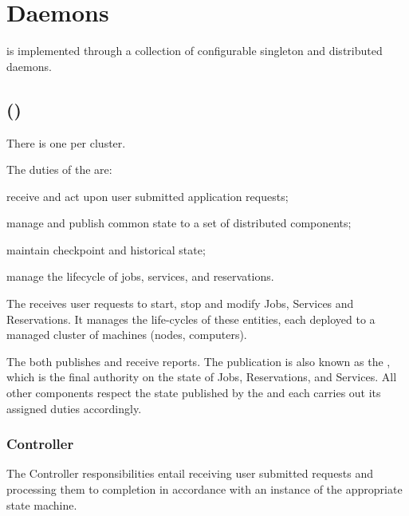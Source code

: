     \section{Daemons}
    
    \varDUCC is implemented through a collection of configurable singleton 
    and distributed daemons.
    
    \subsection{\varOrchestrator (\varOR)} 
    
    There is one \varOrchestrator per \varDUCC cluster.
    
    The duties of the \varOrchestrator are:
    
    \begin{description}
      \item receive and act upon user submitted application requests;
      \item manage and publish common state to a set of distributed components;
      \item maintain checkpoint and historical state;
      \item manage the lifecycle of jobs, services, and reservations.
    \end{description}
    
    The \varOrchestrator receives user requests to start, stop and modify 
    Jobs, Services and Reservations. It manages the life-cycles of these
    entities, each deployed to a managed cluster of machines 
    (nodes, computers).
    
    The \varOrchestrator both publishes and receive reports.  
    The \varOrchestrator publication is also known as the \varORmap, which is
    the final authority on the state of Jobs, Reservations, and Services.
    All other \varDUCC components respect the state published by the \varOrchestrator
    and each carries out its assigned duties accordingly.
    
    \subsubsection{Controller} 
    \label{Controller}
    
    The \varOrchestrator Controller responsibilities entail receiving user 
    submitted requests and processing them to completion in accordance with 
    an instance of the appropriate state machine. 
    
